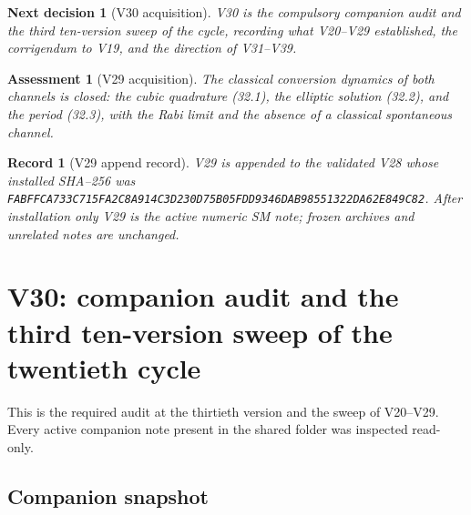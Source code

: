 \documentclass[11pt]{article}
\newtheorem{decision}[theorem]{Next decision}
\newtheorem{assessment}[theorem]{Assessment}
\newtheorem{record}[theorem]{Record}
\theoremstyle{remark}
\begin{document}
\begin{decision}[V30 acquisition]
\label{dec:v20v29-next}
V30 is the compulsory companion audit and the third ten-version
sweep of the cycle, recording what V20--V29 established, the
corrigendum to V19, and the direction of V31--V39.
\end{decision}

\begin{assessment}[V29 acquisition]
\label{ass:v20v29}
The classical conversion dynamics of both channels is closed: the
cubic quadrature (32.1), the elliptic solution (32.2), and the period
(32.3), with the Rabi limit and the absence of a classical
spontaneous channel.
\end{assessment}

\begin{record}[V29 append record]
\label{rec:v20v29}
V29 is appended to the validated V28 whose installed SHA--256 was
\texttt{FABFFCA733C715FA2C8A914C3D230D75B05FDD9346DAB98551322DA62E849C82}.
After installation only V29 is the active numeric SM note; frozen
archives and unrelated notes are unchanged.
\end{record}


\section{V30: companion audit and the third ten-version sweep of the twentieth cycle}
\label{sec:v20v30}

This is the required audit at the thirtieth version and the sweep of
V20--V29.  Every active companion note present in the shared folder
was inspected read-only.

\subsection{Companion snapshot}
\end{document}
